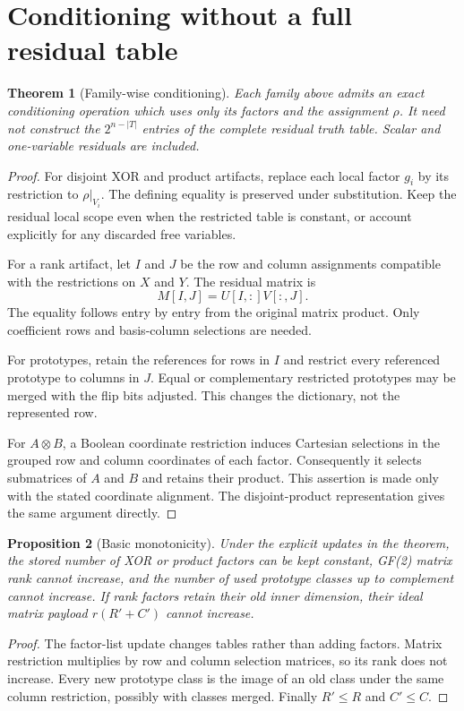 \documentclass[11pt]{article}
\newtheorem{theorem}{Theorem}[section]
\newtheorem{proposition}[theorem]{Proposition}
\theoremstyle{definition}\newtheorem{definition}[theorem]{Definition}
\theoremstyle{remark}\newtheorem{remark}[theorem]{Remark}
\begin{document}
\section{Conditioning without a full residual table}
\label{sec:closure}
\begin{theorem}[Family-wise conditioning]
Each family above admits an exact conditioning operation which uses only its factors and the assignment $\rho$. It need not construct the $2^{n-|T|}$ entries of the complete residual truth table. Scalar and one-variable residuals are included.
\end{theorem}
\begin{proof}
For disjoint XOR and product artifacts, replace each local factor $g_i$ by its restriction to $\rho|_{V_i}$. The defining equality is preserved under substitution. Keep the residual local scope even when the restricted table is constant, or account explicitly for any discarded free variables.

For a rank artifact, let $I$ and $J$ be the row and column assignments compatible with the restrictions on $X$ and $Y$. The residual matrix is
\begin{equation}
 M[I,J]=U[I,:]V[:,J].
 \label{eq:slice}
\end{equation}
The equality follows entry by entry from the original matrix product. Only coefficient rows and basis-column selections are needed.

For prototypes, retain the references for rows in $I$ and restrict every referenced prototype to columns in $J$. Equal or complementary restricted prototypes may be merged with the flip bits adjusted. This changes the dictionary, not the represented row.

For $A\otimes B$, a Boolean coordinate restriction induces Cartesian selections in the grouped row and column coordinates of each factor. Consequently it selects submatrices of $A$ and $B$ and retains their product. This assertion is made only with the stated coordinate alignment. The disjoint-product representation gives the same argument directly.
\end{proof}

\begin{proposition}[Basic monotonicity]
Under the explicit updates in the theorem, the stored number of XOR or product factors can be kept constant, GF(2) matrix rank cannot increase, and the number of used prototype classes up to complement cannot increase. If rank factors retain their old inner dimension, their ideal matrix payload $r(R'+C')$ cannot increase.
\end{proposition}
\begin{proof}
The factor-list update changes tables rather than adding factors. Matrix restriction multiplies by row and column selection matrices, so its rank does not increase. Every new prototype class is the image of an old class under the same column restriction, possibly with classes merged. Finally $R'\le R$ and $C'\le C$.
\end{proof}
\end{document}
